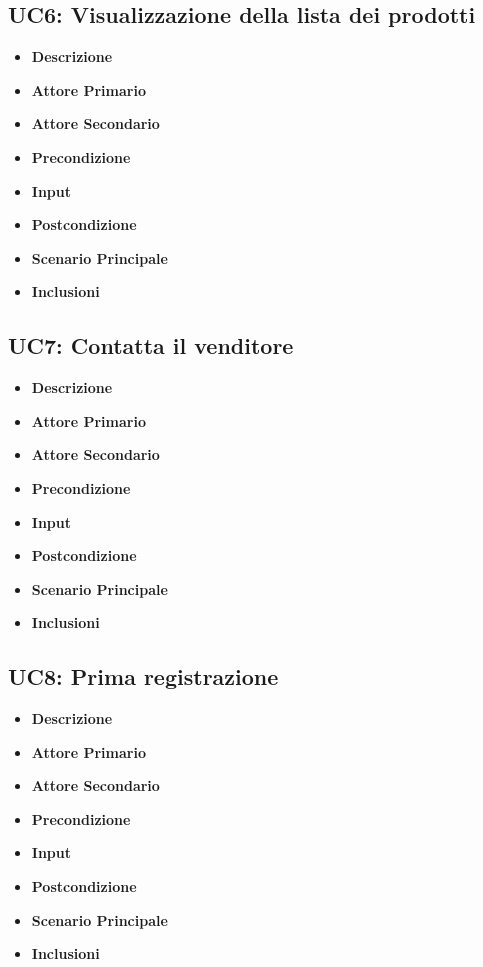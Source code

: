         \subsection{UC6: Visualizzazione della lista dei prodotti}
        \begin{itemize}
            \item \textbf{Descrizione}
            \item \textbf{Attore Primario}
            \item \textbf{Attore Secondario}
            \item \textbf{Precondizione}
            \item \textbf{Input}
            \item \textbf{Postcondizione}
            \item \textbf{Scenario Principale}
            \item \textbf{Inclusioni}
        \end{itemize}
        \subsection{UC7: Contatta il venditore}
        \begin{itemize}
            \item \textbf{Descrizione}
            \item \textbf{Attore Primario}
            \item \textbf{Attore Secondario}
            \item \textbf{Precondizione}
            \item \textbf{Input}
            \item \textbf{Postcondizione}
            \item \textbf{Scenario Principale}
            \item \textbf{Inclusioni}
        \end{itemize}
        \subsection{UC8: Prima registrazione}
        \begin{itemize}
            \item \textbf{Descrizione}
            \item \textbf{Attore Primario}
            \item \textbf{Attore Secondario}
            \item \textbf{Precondizione}
            \item \textbf{Input}
            \item \textbf{Postcondizione}
            \item \textbf{Scenario Principale}
            \item \textbf{Inclusioni}
        \end{itemize}
